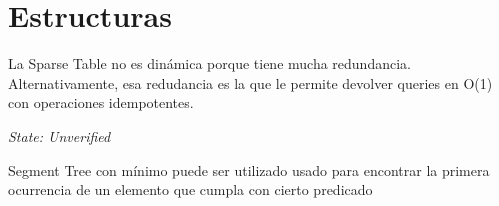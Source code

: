 \section{Estructuras}

La Sparse Table no es dinámica porque tiene mucha redundancia. Alternativamente, esa redudancia es la que le permite devolver queries en O(1) con operaciones idempotentes.

\textit{State: Unverified}

Segment Tree con mínimo puede ser utilizado usado para encontrar la primera ocurrencia de un elemento que cumpla con cierto predicado
